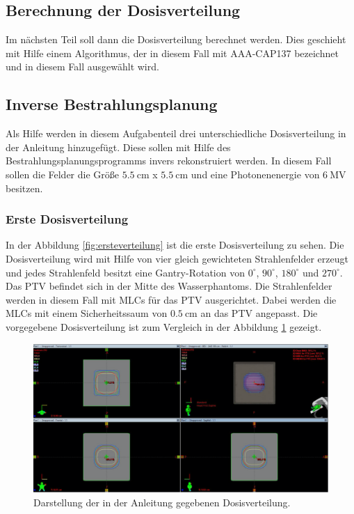 \subsection{Berechnung der Dosisverteilung}
\label{subsec:Dosisverteilung}
Im nächsten Teil soll dann die Dosisverteilung berechnet werden. Dies geschieht mit Hilfe einem Algorithmus, der in diesem Fall mit AAA-CAP137 bezeichnet und in diesem Fall ausgewählt wird.

\subsection{Inverse Bestrahlungsplanung}
\label{subsec:inversebestrahlung}
Als Hilfe werden in diesem Aufgabenteil drei unterschiedliche Dosisverteilung in der Anleitung hinzugefügt. Diese sollen mit Hilfe des Bestrahlungsplanungsprogramms invers rekonstruiert werden. In diesem Fall sollen die Felder die Größe $\SI{5,5}{\centi\meter}$ x $\SI{5,5}{\centi\meter}$ und eine Photonenenergie von $\SI{6}{\mega\volt}$ besitzen.

\subsubsection{Erste Dosisverteilung}
In der Abbildung \ref{fig:ersteverteilung} ist die erste Dosisverteilung zu sehen. Die Dosisverteilung wird mit Hilfe von vier gleich gewichteten Strahlenfelder erzeugt und jedes Strahlenfeld besitzt eine Gantry-Rotation von $0^\circ$, $90^\circ$, $180^\circ$ und $270^\circ$. Das PTV befindet sich in der Mitte des Wasserphantoms. Die Strahlenfelder werden in diesem Fall mit MLCs für das PTV ausgerichtet. Dabei werden die MLCs mit einem Sicherheitssaum von $\SI{0.5}{\centi\meter}$ an das PTV angepasst. Die vorgegebene Dosisverteilung ist zum Vergleich in der Abbildung \ref{abb:ersteverteilung} gezeigt.

\begin{figure}[H]
	\centering
	\includegraphics[width=0.7\linewidth]{../../Wasserphantom Bilder/AnleitungersteVerteilung.png}
	\caption{Darstellung der in der Anleitung gegebenen Dosisverteilung. \cite{Anleitung}}
	\label{abb:ersteverteilung}
\end{figure}


